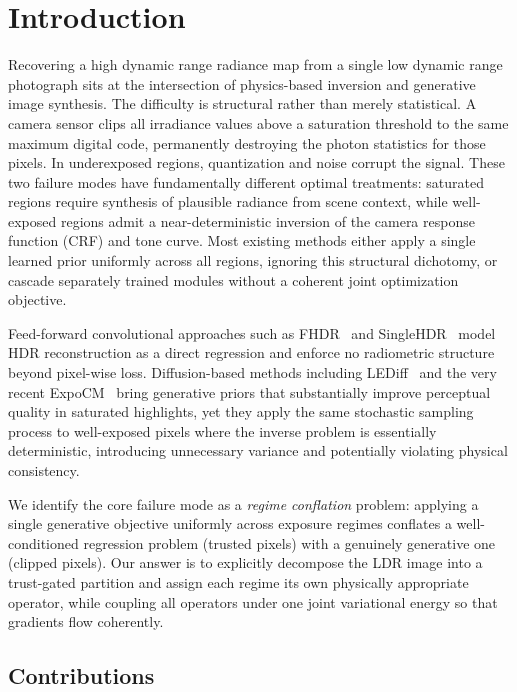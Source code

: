 \documentclass[10pt,twocolumn,letterpaper]{article}
\begin{document}
\section{Introduction}
\label{sec:intro}

Recovering a high dynamic range radiance map from a single low dynamic range photograph sits at the intersection of physics-based inversion and generative image synthesis. The difficulty is structural rather than merely statistical. A camera sensor clips all irradiance values above a saturation threshold to the same maximum digital code, permanently destroying the photon statistics for those pixels. In underexposed regions, quantization and noise corrupt the signal. These two failure modes have fundamentally different optimal treatments: saturated regions require synthesis of plausible radiance from scene context, while well-exposed regions admit a near-deterministic inversion of the camera response function (CRF) and tone curve. Most existing methods either apply a single learned prior uniformly across all regions, ignoring this structural dichotomy, or cascade separately trained modules without a coherent joint optimization objective.

Feed-forward convolutional approaches such as FHDR~\cite{fhdr} and SingleHDR~\cite{singlehdr} model HDR reconstruction as a direct regression and enforce no radiometric structure beyond pixel-wise loss. Diffusion-based methods including LEDiff~\cite{lediff} and the very recent ExpoCM~\cite{expocm} bring generative priors that substantially improve perceptual quality in saturated highlights, yet they apply the same stochastic sampling process to well-exposed pixels where the inverse problem is essentially deterministic, introducing unnecessary variance and potentially violating physical consistency.

We identify the core failure mode as a \emph{regime conflation} problem: applying a single generative objective uniformly across exposure regimes conflates a well-conditioned regression problem (trusted pixels) with a genuinely generative one (clipped pixels). Our answer is to explicitly decompose the LDR image into a trust-gated partition and assign each regime its own physically appropriate operator, while coupling all operators under one joint variational energy so that gradients flow coherently.

\subsection{Contributions}
\end{document}
